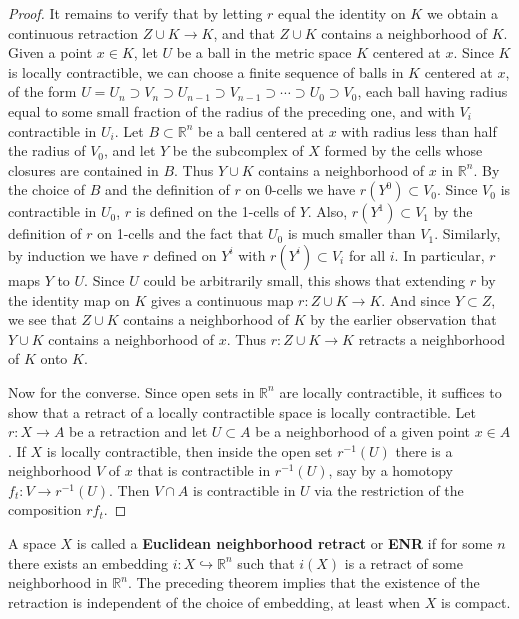 \documentclass{article}
\theoremstyle{definition}
\begin{document}
\begin{proof}
It remains to verify that by letting $r$ equal the identity on $K$ we obtain a continuous retraction $Z \cup K \to K$, and that $Z \cup K$ contains a neighborhood of $K$. Given a point $x \in K$, let $U$ be a ball in the metric space $K$ centered at $x$. Since $K$ is locally contractible, we can choose a finite sequence of balls in $K$ centered at $x$, of the form $U = U_n \supset V_n \supset U_{n-1} \supset V_{n-1} \supset \cdots \supset U_0 \supset V_0$, each ball having radius equal to some small fraction of the radius of the preceding one, and with $V_i$ contractible in $U_i$. Let $B \subset \mathbb{R}^n$ be a ball centered at $x$ with radius less than half the radius of $V_0$, and let $Y$ be the subcomplex of $X$ formed by the cells whose closures are contained in $B$. Thus $Y \cup K$ contains a neighborhood of $x$ in $\mathbb{R}^n$. By the choice of $B$ and the definition of $r$ on 0-cells we have $r(Y^0) \subset V_0$. Since $V_0$ is contractible in $U_0$, $r$ is defined on the 1-cells of $Y$. Also, $r(Y^1) \subset V_1$ by the definition of $r$ on 1-cells and the fact that $U_0$ is much smaller than $V_1$. Similarly, by induction we have $r$ defined on $Y^i$ with $r(Y^i) \subset V_i$ for all $i$. In particular, $r$ maps $Y$ to $U$. Since $U$ could be arbitrarily small, this shows that extending $r$ by the identity map on $K$ gives a continuous map $r: Z \cup K \to K$. And since $Y \subset Z$, we see that $Z \cup K$ contains a neighborhood of $K$ by the earlier observation that $Y \cup K$ contains a neighborhood of $x$. Thus $r: Z \cup K \to K$ retracts a neighborhood of $K$ onto $K$.

Now for the converse. Since open sets in $\mathbb{R}^n$ are locally contractible, it suffices to show that a retract of a locally contractible space is locally contractible. Let $r: X \to A$ be a retraction and let $U \subset A$ be a neighborhood of a given point $x \in A$. If $X$ is locally contractible, then inside the open set $r^{-1}(U)$ there is a neighborhood $V$ of $x$ that is contractible in $r^{-1}(U)$, say by a homotopy $f_t: V \to r^{-1}(U)$. Then $V \cap A$ is contractible in $U$ via the restriction of the composition $rf_t$.
\end{proof}

A space $X$ is called a \textbf{Euclidean neighborhood retract} or \textbf{ENR} if for some $n$ there exists an embedding $i: X \hookrightarrow \mathbb{R}^n$ such that $i(X)$ is a retract of some neighborhood in $\mathbb{R}^n$. The preceding theorem implies that the existence of the retraction is independent of the choice of embedding, at least when $X$ is compact.
\end{document}
